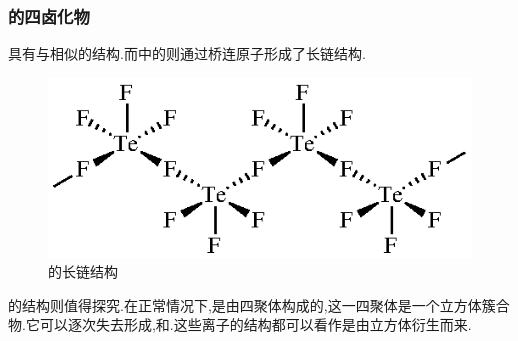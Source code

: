 \documentclass{ctexart}
\begin{document}
\subsubsection{的四卤化物}
具有与相似的结构.而中的则通过桥连原子形成了长链结构.
\begin{figure}[H]
    \centering\includegraphics{picture/TeF4.eps}
    \caption{的长链结构}
\end{figure}
的结构则值得探究.在正常情况下,是由四聚体构成的,这一四聚体是一个立方体簇合物.它可以逐次失去形成,和.这些离子的结构都可以看作是由立方体衍生而来.
\end{document}
